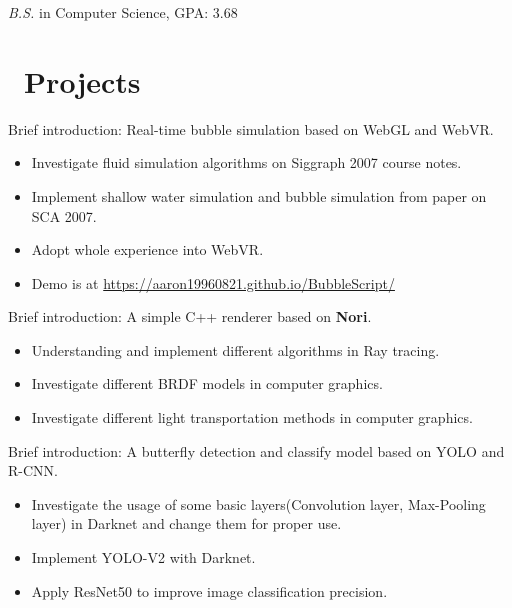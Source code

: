 \documentclass{resume}
\begin{document}



\textit{B.S.} in Computer Science, GPA: 3.68

\section{\faUsers\ Projects}

Brief introduction: Real-time bubble simulation based on WebGL and WebVR.
\begin{itemize}
    \item Investigate fluid simulation algorithms on Siggraph 2007 course notes.
    \item Implement shallow water simulation and bubble simulation from paper on SCA 2007.
    \item Adopt whole experience into WebVR.
    \item Demo is at \url{https://aaron19960821.github.io/BubbleScript/}
\end{itemize}

Brief introduction: A simple C++ renderer based on \textbf{Nori}.
\begin{itemize}
    \item Understanding and implement different algorithms in Ray tracing.
    \item Investigate different BRDF models in computer graphics.
    \item Investigate different light transportation methods in computer graphics.
\end{itemize}

Brief introduction: A butterfly detection and classify model based on YOLO and R-CNN.
\begin{itemize}
	\item Investigate the usage of some basic layers(Convolution layer, Max-Pooling layer) in Darknet and change them for proper use.
  \item Implement YOLO-V2 with Darknet.
	\item Apply ResNet50 to improve image classification precision.
\end{itemize}
\end{document}

